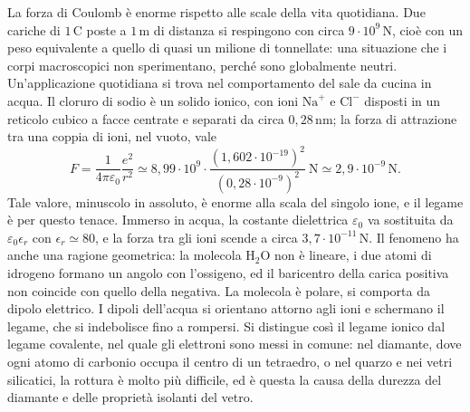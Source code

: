 \documentclass[11pt,a4paper]{article}
\newcommand{\epz}{\varepsilon_0}
\begin{document}
La forza di Coulomb è enorme rispetto alle scale della vita quotidiana. Due cariche di $1\,\mathrm{C}$ poste a $1\,\mathrm{m}$ di distanza si respingono con circa $9\cdot 10^{9}\,\mathrm{N}$, cioè con un peso equivalente a quello di quasi un milione di tonnellate: una situazione che i corpi macroscopici non sperimentano, perché sono globalmente neutri. Un'applicazione quotidiana si trova nel comportamento del sale da cucina in acqua. Il cloruro di sodio è un solido ionico, con ioni $\mathrm{Na}^+$ e $\mathrm{Cl}^-$ disposti in un reticolo cubico a facce centrate e separati da circa $0,28\,\mathrm{nm}$; la forza di attrazione tra una coppia di ioni, nel vuoto, vale
\[
F=\frac{1}{4\pi\epz}\frac{e^2}{r^2}\simeq 8,99\cdot 10^{9}\cdot\frac{(1,602\cdot 10^{-19})^2}{(0,28\cdot 10^{-9})^2}\ \mathrm{N}\simeq 2,9\cdot 10^{-9}\,\mathrm{N}.
\]
Tale valore, minuscolo in assoluto, è enorme alla scala del singolo ione, e il legame è per questo tenace. Immerso in acqua, la costante dielettrica $\epz$ va sostituita da $\epz\epsilon_r$ con $\epsilon_r\simeq 80$, e la forza tra gli ioni scende a circa $3,7\cdot 10^{-11}\,\mathrm{N}$. Il fenomeno ha anche una ragione geometrica: la molecola $\mathrm{H_2O}$ non è lineare, i due atomi di idrogeno formano un angolo con l'ossigeno, ed il baricentro della carica positiva non coincide con quello della negativa. La molecola è polare, si comporta da dipolo elettrico. I dipoli dell'acqua si orientano attorno agli ioni e schermano il legame, che si indebolisce fino a rompersi. Si distingue così il legame ionico dal legame covalente, nel quale gli elettroni sono messi in comune: nel diamante, dove ogni atomo di carbonio occupa il centro di un tetraedro, o nel quarzo e nei vetri silicatici, la rottura è molto più difficile, ed è questa la causa della durezza del diamante e delle proprietà isolanti del vetro.
\end{document}
